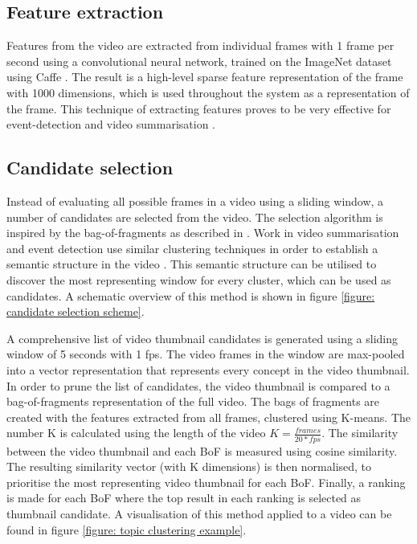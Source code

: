 \documentclass{../resources/sig-alternate-05-2015}
\begin{document}
\subsection{Feature extraction}
\label{section: feature extraction}
Features from the video are extracted from individual frames with 1 frame per second using a convolutional neural network, trained on the ImageNet dataset \cite{Krizhevsky:2012wl} using Caffe \cite{Jia:2014cm}. The result is a high-level sparse feature representation of the frame with 1000 dimensions, which is used throughout the system as a representation of the frame. This technique of extracting features proves to be very effective for event-detection \cite{Habibian:2013ks,Althoff:2012gf,Jiang:2012fy} and video summarisation \cite{Ajmal:2012hi,Mazloom:2015el}.

\subsection{Candidate selection}
\label{section: candidate selection}

Instead of evaluating all possible frames in a video using a sliding window, a number of candidates are selected from the video. The selection algorithm is inspired by the bag-of-fragments as described in \cite{Mettes:2015vg}. Work in video summarisation and event detection use similar clustering techniques in order to establish a semantic structure in the video \cite{Yuan:2011fu,Habibian:2014dc}. This semantic structure can be utilised to discover the most representing window for every cluster, which can be used as candidates. A schematic overview of this method is shown in figure \ref{figure: candidate selection scheme}.

A comprehensive list of video thumbnail candidates is generated using a sliding window of 5 seconds with 1 fps. The video frames in the window are max-pooled into a vector representation that represents every concept in the video thumbnail. In order to prune the list of candidates, the video thumbnail is compared to a bag-of-fragments representation of the full video. The bags of fragments are created with the features extracted from all frames, clustered using K-means. The number K is calculated using the length of the video $K = \frac{frames}{20 * fps}$. The similarity between the video thumbnail and each BoF is measured using cosine similarity. The resulting similarity vector (with K dimensions) is then normalised, to prioritise the most representing video thumbnail for each BoF. Finally, a ranking is made for each BoF where the top result in each ranking is selected as thumbnail candidate. A visualisation of this method applied to a video can be found in figure \ref{figure: topic clustering example}.
\end{document}
